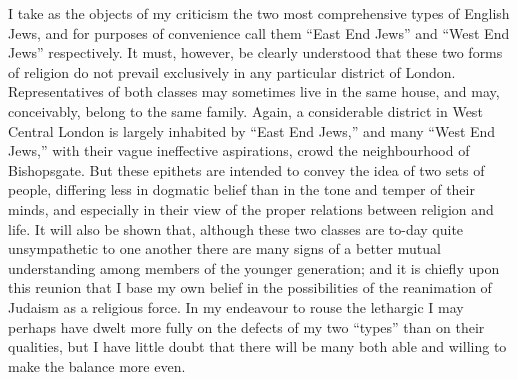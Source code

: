 I take as the objects of my criticism the two most 
comprehensive types of English Jews, and for purposes of 
convenience call them ``East End Jews'' and ``West End 
Jews'' respectively. It must, however, be clearly understood 
that these two forms of religion do not prevail exclusively
in any particular district of London. Representatives 
of both classes may sometimes live in the same house, 
and may, conceivably, belong to the same family. Again, 
a considerable district in West Central London is largely 
inhabited by ``East End Jews,'' and many ``West End 
Jews,'' with their vague ineffective aspirations, crowd the 
neighbourhood of Bishopsgate. But these epithets are 
intended to convey the idea of two sets of people, differing 
less in dogmatic belief than in the tone and temper of 
their minds, and especially in their view of the proper 
relations between religion and life. It will also be shown 
that, although these two classes are to-day quite unsympathetic
to one another there are many signs of a better 
mutual understanding among members of the younger 
generation; and it is chiefly upon this reunion that I 
base my own belief in the possibilities of the reanimation 
of Judaism as a religious force. In my endeavour to 
rouse the lethargic I may perhaps have dwelt more fully 
on the defects of my two ``types'' than on their qualities, 
but I have little doubt that there will be many both able 
and willing to make the balance more even. 

